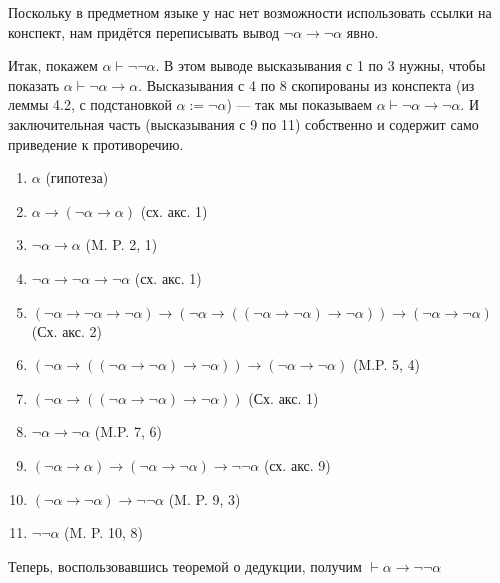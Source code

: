 \documentclass[10pt,a4paper,oneside]{article}
\begin{document}
\begin{enumerate}[label=(\alph*)]
  Поскольку в предметном языке у нас нет возможности использовать ссылки на конспект, 
  нам придётся переписывать вывод 
  $\neg\alpha\rightarrow\neg\alpha$ явно.

  Итак, покажем $\alpha\vdash\neg\neg\alpha$. В этом выводе
  высказывания с 1 по 3 нужны, чтобы показать
  $\alpha\vdash\neg\alpha\rightarrow\alpha$. Высказывания с 4 по 8 
  скопированы из конспекта (из леммы 4.2, с 
  подстановкой $\alpha := \neg\alpha$) --- так мы показываем
  $\alpha\vdash\neg\alpha\rightarrow\neg\alpha$.
  И заключительная часть (высказывания с 9 по 11) собственно и 
  содержит само приведение к противоречию.

\begin{enumerate}[label=(\arabic*)]
\item $\alpha$ (гипотеза)
\item $\alpha\rightarrow(\neg\alpha\rightarrow\alpha)$ (сх. акс. 1)
\item $\neg\alpha\rightarrow\alpha$ (M. P. 2, 1)
\item $\neg\alpha\rightarrow\neg\alpha\rightarrow\neg\alpha$ (сх. акс. 1)
\item $(\neg\alpha \rightarrow \neg\alpha \rightarrow \neg\alpha) \rightarrow 
  (\neg\alpha \rightarrow ((\neg\alpha \rightarrow \neg\alpha) \rightarrow \neg\alpha)) \rightarrow
  (\neg\alpha \rightarrow \neg\alpha)$ (Сх. акс. 2)
\item $(\neg\alpha \rightarrow ((\neg\alpha \rightarrow \neg\alpha) \rightarrow \neg\alpha)) \rightarrow
  (\neg\alpha \rightarrow \neg\alpha)$ (M.P. 5, 4)
\item $(\neg\alpha \rightarrow ((\neg\alpha \rightarrow \neg\alpha) \rightarrow \neg\alpha))$ (Сх. акс. 1)
\item $\neg\alpha\rightarrow\neg\alpha$ (M.P. 7, 6)
\item $(\neg\alpha\rightarrow\alpha)\rightarrow(\neg\alpha\rightarrow\neg\alpha)\rightarrow\neg\neg\alpha$ (сх. акс. 9)
\item $(\neg\alpha\rightarrow\neg\alpha)\rightarrow\neg\neg\alpha$ (M. P. 9, 3)
\item $\neg\neg\alpha$ (M. P. 10, 8)
\end{enumerate}

  Теперь, воспользовавшись теоремой о дедукции, получим 
  $\vdash\alpha\rightarrow\neg\neg\alpha$


\end{enumerate}
\end{document}
